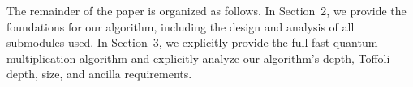 \documentclass[reprint,amsmath,amssymb,aps,pra]{revtex4-2}
\begin{document}

The remainder of the paper is organized as follows. In Section~2, we provide the foundations for our algorithm, including the design and analysis of all submodules used. In Section~3, we explicitly provide the full fast quantum multiplication algorithm and explicitly analyze our algorithm's depth, Toffoli depth, size, and ancilla requirements.
\end{document}

